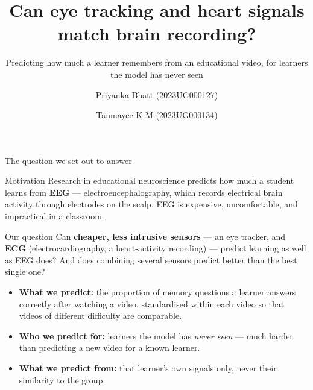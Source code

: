 \documentclass[aspectratio=169,10pt]{beamer}
\title[Can eye tracking and heart signals match EEG?]%
      {Can eye tracking and heart signals match brain recording?}
\subtitle{Predicting how much a learner remembers from an educational video,
  for learners the model has never seen}
\author[Bhatt \& Tanmayee]{Priyanka Bhatt (2023UG000127) \and Tanmayee K M (2023UG000134)}
\institute{DATA404 Multimodal Machine Learning \\ Vidyashilp University
  \quad$\cdot$\quad Dr.\ Minati Rath}
\date{}
\begin{document}
\begin{frame}[plain]
  \titlepage
\end{frame}

\begin{frame}{The question we set out to answer}
  \begin{block}{Motivation}
    Research in educational neuroscience predicts how much a student learns
    from \textbf{EEG} --- electroencephalography, which records electrical
    brain activity through electrodes on the scalp. EEG is expensive,
    uncomfortable, and impractical in a classroom.
  \end{block}

  \vspace{0.4em}
  \begin{block}{Our question}
    Can \textbf{cheaper, less intrusive sensors} --- an eye tracker, and
    \textbf{ECG} (electrocardiography, a heart-activity recording) --- predict
    learning as well as EEG does? And does combining several sensors predict
    better than the best single one?
  \end{block}

  \vspace{0.4em}
  \begin{itemize}\small
    \item \textbf{What we predict:} the proportion of memory questions a
      learner answers correctly after watching a video, standardised within
      each video so that videos of different difficulty are comparable.
    \item \textbf{Who we predict for:} learners the model has \emph{never seen}
      --- much harder than predicting a new video for a known learner.
    \item \textbf{What we predict from:} that learner's own signals only, never
      their similarity to the group.
  \end{itemize}
\end{frame}
\end{document}
